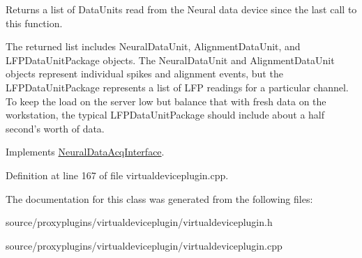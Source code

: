 Returns a list of Data\-Units read from the Neural data device since the last call to this function. 

The returned list includes Neural\-Data\-Unit, Alignment\-Data\-Unit, and L\-F\-P\-Data\-Unit\-Package objects. The Neural\-Data\-Unit and Alignment\-Data\-Unit objects represent individual spikes and alignment events, but the L\-F\-P\-Data\-Unit\-Package represents a list of L\-F\-P readings for a particular channel. To keep the load on the server low but balance that with fresh data on the workstation, the typical L\-F\-P\-Data\-Unit\-Package should include about a half second's worth of data. 

Implements \hyperlink{class_neural_data_acq_interface_a5726ef21daaedd9947640b146e554c97}{Neural\-Data\-Acq\-Interface}.



Definition at line 167 of file virtualdeviceplugin.\-cpp.



The documentation for this class was generated from the following files\-:\begin{DoxyCompactItemize}
\item 
source/proxyplugins/virtualdeviceplugin/virtualdeviceplugin.\-h\item 
source/proxyplugins/virtualdeviceplugin/virtualdeviceplugin.\-cpp\end{DoxyCompactItemize}
